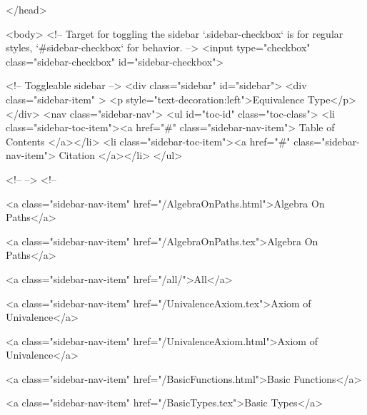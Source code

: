   
</head>




  <body>
    <!-- Target for toggling the sidebar `.sidebar-checkbox` is for regular
     styles, `#sidebar-checkbox` for behavior. -->
<input type="checkbox" class="sidebar-checkbox" id="sidebar-checkbox">

<!-- Toggleable sidebar -->
<div class="sidebar" id="sidebar">
  <div class="sidebar-item" >
    <p style="text-decoration:left">Equivalence Type</p>
  </div>
  <nav class="sidebar-nav">
    <ul id="toc-id" class="toc-class">
  <li class="sidebar-toc-item"><a href="#" class="sidebar-nav-item"> Table of Contents </a></li>
  <li class="sidebar-toc-item"><a href="#" class="sidebar-nav-item"> Citation </a></li>
</ul>


    <!--  -->
    <!-- 
      
    
      
    
      
    
      
        
      
    
      
        
          <a class="sidebar-nav-item" href="/AlgebraOnPaths.html">Algebra On Paths</a>
        
      
    
      
        
          <a class="sidebar-nav-item" href="/AlgebraOnPaths.tex">Algebra On Paths</a>
        
      
    
      
        
          <a class="sidebar-nav-item" href="/all/">All</a>
        
      
    
      
        
          <a class="sidebar-nav-item" href="/UnivalenceAxiom.tex">Axiom of Univalence</a>
        
      
    
      
        
          <a class="sidebar-nav-item" href="/UnivalenceAxiom.html">Axiom of Univalence</a>
        
      
    
      
        
          <a class="sidebar-nav-item" href="/BasicFunctions.html">Basic Functions</a>
        
      
    
      
        
          <a class="sidebar-nav-item" href="/BasicTypes.tex">Basic Types</a>
        

